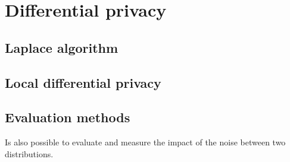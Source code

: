 \section{Differential privacy}
\subsection{Laplace algorithm}
\subsection{Local differential privacy}
\subsection{Evaluation methods}
Is also possible to evaluate and measure the impact of the noise between two distributions.

